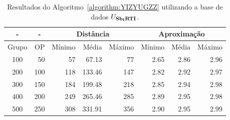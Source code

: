 \begin{table}[!htb]
  \caption{Resultados do Algoritmo~\ref{algorithm:YIZYUGZZ} utilizando a base de dados $U_{\textbf{Sb\textsubscript{I}RTI}}{}$.}
  \label{table:MFWVXYQH}
  \centering
  \begin{tabular}{|c|r|r|r|r|r|r|r|}
    \hline
      -      & \multicolumn{1}{c|}{-} & \multicolumn{3}{c|}{Distância}             & \multicolumn{3}{c|}{Aproximação}           \\ \hline
    Grupo    & OP                     & Mínimo       & Média        & Máximo       & Mínimo       & Média        & Máximo       \\ \hline  
    100      & 50                     & 57           &  67.13       & 77           & 2.65         & 2.86         & 2.96         \\ \hline
    200      & 100                    & 118          & 133.46       & 147          & 2.82         & 2.92         & 2.97         \\ \hline
    300      & 150                    & 184          & 199.48       & 218          & 2.85         & 2.94         & 2.98         \\ \hline
    400      & 200                    & 249          & 265.46       & 285          & 2.89         & 2.95         & 2.98         \\ \hline
    500      & 250                    & 308          & 331.91       & 356          & 2.90         & 2.95         & 2.99         \\ \hline    
  \end{tabular}
\end{table}